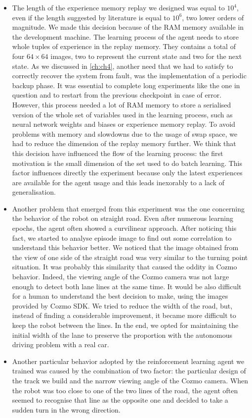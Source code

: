 \begin{itemize}
	\item The length of the experience memory replay we designed was equal to $10^4$, even if the length suggested by literature is equal to $10^6$, two lower orders of magnitude.
	      We made this decision because of the RAM memory available in the development machine. The learning process of the agent needs to store whole tuples of experience in the replay memory.
	      They contains a total of four $64 \times 64$ images, two to represent the current state and two for the next state.
	      As we discussed in \vref{ch:ch4}, another need that we had to satisfy to correctly recover the system from fault, was the implementation of a periodic backup phase.
	      It was essential to complete long experiments like the one in question and to restart from the previous checkpoint in case of error.
	      However, this process needed a lot of RAM memory to store a serialised version of the whole set of variables used in the learning process, such as neural network weights and biases or experience memory replay.
	      To avoid problems with memory and slowdowns due to the usage of swap space, we had to reduce the dimension of the replay memory further.
	      We think that this decision have influenced the flow of the learning process: the first motivation is the small dimension of the set used to do batch learning.
	      This factor influences directly the experiment because only the latest experiences are available for the agent usage and this leads inexorably to a lack of generalisation.
	\item Another problem that emerged from this experiment was the one concerning the behavior of the robot on straight road.
	      Even after numerous learning epochs, the agent often showed a curvilinear approach.
	      After noticing this fact, we started to analyse episode image to find out some correlation to understand this behavior better.
	      We noticed that the image obtained from the view of one side of the straight road was very similar to the turning point situation.
	      It was probably this similarity that caused the oddity in Cozmo behavior.
	      Indeed, the viewing angle of the Cozmo camera was not large enough to detect both lane lines at the same time.
	      It would be also difficult for a human to understand the best decision to make, using the images provided by Cozmo SDK.
	      We tried to reduce the width of the road, but, instead of finding a considerable improvement, it became more difficult to keep the robot between the lines.
	      In the end, we opted for maintaining the initial width of the lane to preserve the proportion with the autonomous driving problem with a real car.
	\item Another particular behavior adopted by the reinforcement learning agent we trained was caused by the combination of two factor: the particular design of the track we build and the narrow viewing angle of the Cozmo camera.
		  When the robot was too close to one of the two lines of the road, the agent often seemed to recognise that line as the opposite one and decided to take a sudden turn in the wrong direction.
\end{itemize}

